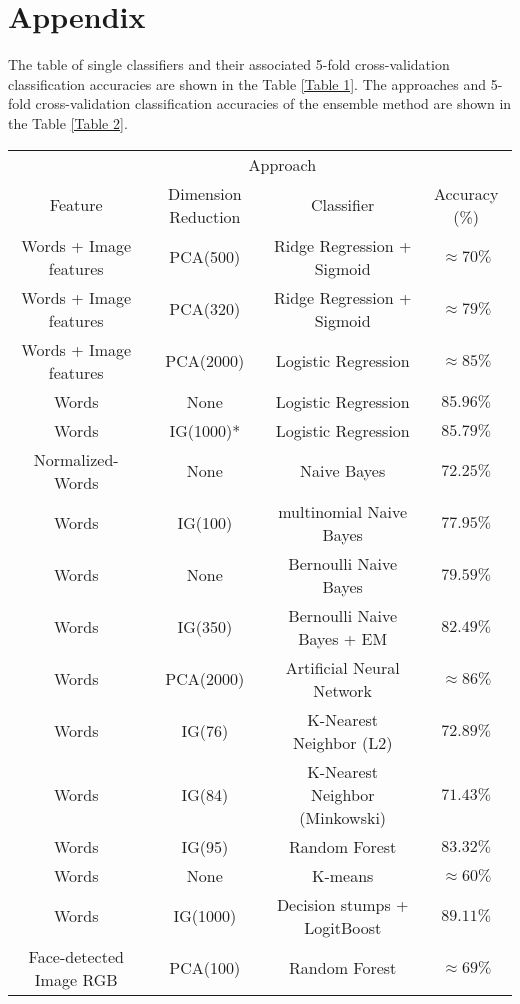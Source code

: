 \section{Appendix}

The table of single classifiers and their associated 5-fold cross-validation classification accuracies are shown in the Table \ref{Table 1}. The approaches and 5-fold cross-validation classification accuracies of the ensemble method are shown in the Table \ref{Table 2}.

\begin{table}[h!]
\centering
\begin{tabular*}{\textwidth}{c @{\extracolsep{\fill}}ccc}
\hline
& \multicolumn{2}{c}{Approach}\\
\cline{2-3}
Feature & Dimension Reduction & Classifier & Accuracy (\%) \\
\hline
\hline 
Words + Image features & PCA(500) & Ridge Regression + Sigmoid & $\approx 70\%$\\ \hline
Words + Image features & PCA(320) & Ridge Regression + Sigmoid & $\approx 79\%$ \\ \hline
Words + Image features & PCA(2000) & Logistic Regression & $\approx 85\%$ \\ \hline
Words & None & Logistic Regression & $ 85.96\%$ \\ \hline
Words & IG(1000)* & Logistic Regression & $ 85.79\%$ \\ \hline
Normalized-Words & None & Naive Bayes & $72.25\%$ \\ \hline
Words & IG(100) & multinomial Naive Bayes & $ 77.95\%$ \\ \hline
Words & None & Bernoulli Naive Bayes & $ 79.59\%$ \\ \hline
Words & IG(350) & Bernoulli Naive Bayes + EM & $ 82.49\%$ \\ \hline
Words & PCA(2000) & Artificial Neural Network & $ \approx 86\%$ \\ \hline
Words & IG(76) & K-Nearest Neighbor (L2) & $ 72.89\%$ \\ \hline
Words & IG(84) & K-Nearest Neighbor (Minkowski)  & $ 71.43\%$ \\ \hline
Words & IG(95) & Random Forest & $83.32\%$ \\ \hline
Words & None & K-means & $ \approx 60\%$\\ \hline
Words & IG(1000) & Decision stumps + LogitBoost& $89.11\%$\\ \hline
Face-detected Image RGB & PCA(100) & Random Forest & $\approx 69\%$ \\ \hline

\end{tabular*}
\end{table}
